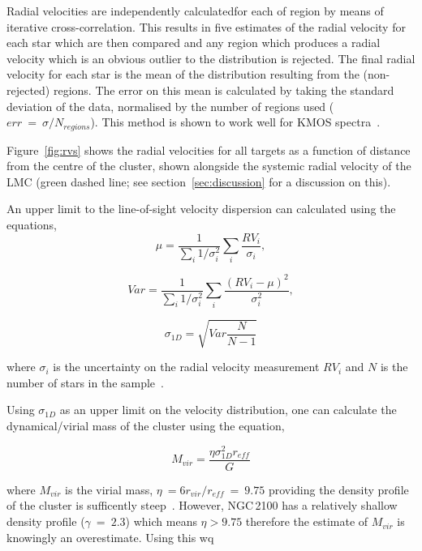 \documentclass[useAMS,usenatbib]{mn2e}
\begin{document}
Radial velocities are independently calculatedfor each of region by means of iterative cross-correlation.
This results in five estimates of the radial velocity for each star which are then compared and any region which produces a radial velocity which is an obvious outlier to the distribution is rejected.
The final radial velocity for each star is the mean of the distribution resulting from the (non-rejected) regions.
The error on this mean is calculated by taking the standard deviation of the data, normalised by the number of regions used ($err~=~\sigma/N_{regions}$).
This method is shown to work well for KMOS spectra~\citep{2015ApJ...798...23L,2015ApJ...803...14P}.

Figure~\ref{fig:rvs} shows the radial velocities for all targets as a function of distance from the centre of the cluster, shown alongside the systemic radial velocity of the LMC (green dashed line; see section~\ref{sec:discussion} for a discussion on this).

An upper limit to the line-of-sight velocity dispersion can calculated using the equations,
\begin{equation}
  \mu = \frac{1}{\sum_{i} 1/\sigma_{i}^{2}} \sum_{i} \frac{RV_{i}}{\sigma_{i}},
\end{equation}

\begin{equation}
Var = \frac{1}{\sum_{i}1/\sigma_{i}^{2}} \sum_{i}\frac{(RV_{i} - \mu)^{2}}{\sigma_{i}^{2}},
\end{equation}

\begin{equation}
  \sigma_{1D} = \sqrt{Var \frac{N}{N - 1}}
\end{equation}

\noindent where $\sigma_{i}$ is the uncertainty on the radial velocity measurement $RV_{i}$ and $N$ is the number of stars in the sample~\citep[and references therin]{2012A&A...546A..73H}.

Using $\sigma_{1D}$ as an upper limit on the velocity distribution, one can calculate the dynamical/virial mass of the cluster using the equation,

\begin{equation}
  M_{vir} = \frac{\eta\sigma_{1D}^{2}r_{eff}}{G}
\end{equation}

\noindent where $M_{vir}$ is the virial mass, $\eta~=6r_{vir}/r_{eff}~=~9.75$ providing the density profile of the cluster is sufficently steep~\citep{2010ARA&A..48..431P}.
However, NGC\,2100 has a relatively shallow density profile ($\gamma~=~2.3$) which means $\eta>9.75$ therefore the estimate of $M_{vir}$ is knowingly an overestimate.
Using this wq
\end{document}
